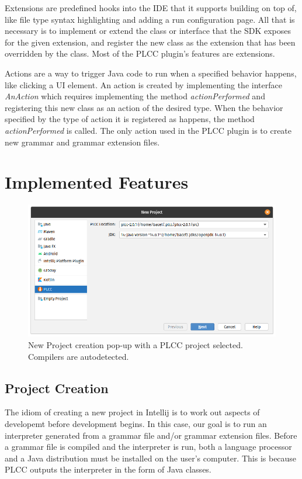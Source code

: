 \documentclass[conference, letterpaper]{IEEEtran}
\begin{document}
Extensions are predefined hooks into the IDE that it supports building on top of, like file type syntax highlighting and adding a run configuration page.
All that is necessary is to implement or extend the class or interface that the SDK exposes for the given extension, and register the new class as the extension that has been overridden by the class.
Most of the PLCC plugin's features are extensions.

Actions are a way to trigger Java code to run when a specified behavior happens, like clicking a UI element.
An action is created by implementing the interface \textit{AnAction} which requires implementing the method \textit{actionPerformed} and registering this new class as an action of the desired type.
When the behavior specified by the type of action it is registered as happens, the method \textit{actionPerformed} is called.
The only action used in the PLCC plugin is to create new grammar and grammar extension files.


\section{Implemented Features}\label{sec:implemented-features}
\begin{figure}[!t]
    \centering
    \includegraphics[width=6in]{proj_config.png}
    \caption{New Project creation pop-up with a PLCC project selected. Compilers are autodetected.}
    \label{fig:proj_config}
\end{figure}

\subsection{Project Creation}\label{subsec:project-creation}
The idiom of creating a new project in Intellij is to work out aspects of developemt before development begins.
In this case, our goal is to run an interpreter generated from a grammar file and/or grammar extension files.
Before a grammar file is compiled and the interpreter is run, both a language processor and a Java distribution must be installed on the user's computer.
This is because PLCC outputs the interpreter in the form of Java classes.
\end{document}
